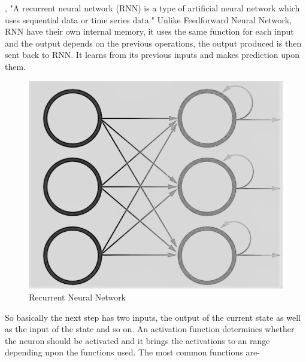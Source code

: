 \documentclass[oneside,12pt]{Classes/RoboticsLaTeX}
\begin{document}
\cite{ibm}, "A recurrent neural network (RNN) is a type of artificial neural network which uses sequential data or time series data." Unlike Feedforward Neural Network, RNN have their own internal memory, it uses the same function for each input and the output depends on the previous operations, the output produced is then sent back to RNN. It learns from its previous inputs and makes prediction upon them.
\begin{figure}[H]
  \centering
  \includegraphics[width=0.5\linewidth]{Figures/rnn.png}
  \caption{Recurrent Neural Network}
  \label{fig:rnn}
\end{figure}
So basically the next step has two inputs, the output of the current state as well as the input of the state and so on. An activation function determines whether the neuron should be activated and it brings the activations to an range depending upon the functions used. The most common functions are-
\end{document}
